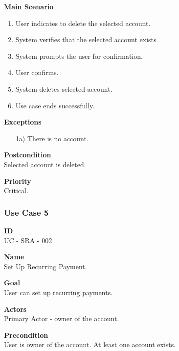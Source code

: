 \documentclass[12pt]{article}
\begin{document}
\noindent
{\bf Main Scenario}\\
\vspace*{-0.2in}
\begin{enumerate}
\item User indicates to delete the selected account.
\item System verifies that the selected account exists
\item System prompts the user for confirmation.
\item User confirms.
\item System deletes selected account.
  \item Use case ends successfully.
\end{enumerate}

\noindent
    {\bf Exceptions}\\
    \vspace{-0.2in}
    \begin{itemize}
    \item[1a)] There is no account.
    \end{itemize}

\noindent
{\bf Postcondition}\\
Selected account is deleted.

\noindent
{\bf Priority}\\
Critical.

\subsubsection{Use Case 5} \label{uc:5}

\noindent
{\bf ID}\\
UC - SRA - 002

\noindent
{\bf Name}\\
Set Up Recurring Payment.

\noindent
{\bf Goal}\\
User can set up recurring payments.

\noindent
{\bf Actors}\\
Primary Actor - owner of the account.

\noindent
{\bf Precondition}\\
User is owner of the account.
At least one account exists.
\end{document}
